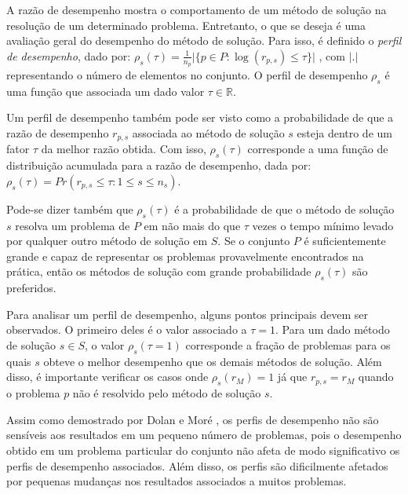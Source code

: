 \documentclass{MO824}
\begin{document}
A razão de desempenho mostra o comportamento de um método de solução na resolução de um determinado problema. Entretanto, o que se deseja é uma avaliação geral do desempenho do método de solução. Para isso, é definido o \textit{perfil de desempenho}, dado por: $ \rho_{s}(\tau) = \frac{1}{n_{p}} \vert \{p \in P : \log{(r_{p, s})} \le \tau \} \vert $ ,
com $\vert . \vert$ representando o número de elementos no conjunto. O perfil de desempenho $\rho_{s}$ é uma função que associada um dado valor $\tau \in \mathbb{R}$.

Um perfil de desempenho também pode ser visto como a probabilidade de que a razão de desempenho $r_{p,s}$ associada ao método de solução $s$ esteja dentro de um fator $\tau$ da melhor razão obtida. Com isso, $\rho_{s}(\tau)$ corresponde a uma função de distribuição acumulada para a razão de desempenho, dada por: $\rho_{s}(\tau) = Pr(r_{p, s} \le \tau : 1 \le s \le n_{s})$.

Pode-se dizer também que $\rho_{s}(\tau)$ é a probabilidade de que o método de solução $s$ resolva um problema de $P$ em não mais do que $\tau$ vezes o tempo mínimo levado por qualquer outro método de solução em $S$. Se o conjunto $P$ é suficientemente grande e capaz de representar os problemas provavelmente encontrados na prática, então os métodos de solução com grande probabilidade $\rho_{s}(\tau)$ são preferidos.

Para analisar um perfil de desempenho, alguns pontos principais devem ser observados. O primeiro deles é o valor associado a $\tau = 1$. Para um dado método de solução $s \in S$, o valor $\rho_{s}(\tau = 1)$ corresponde a fração de problemas para os quais $s$ obteve o melhor desempenho que os demais métodos de solução. Além disso, é importante verificar os casos onde $\rho_{s}(r_{M}) = 1$ já que $r_{p, s} = r_{M}$ quando o problema $p$ não é resolvido pelo método de solução $s$.

Assim como demostrado por Dolan e Moré \cite{pp}, os perfis de desempenho não são sensíveis aos resultados em um pequeno número de problemas, pois o desempenho obtido em um problema particular do conjunto não afeta de modo significativo os perfis de desempenho associados. Além disso, os perfis são dificilmente afetados por pequenas mudanças nos resultados associados a muitos problemas.
\end{document}
